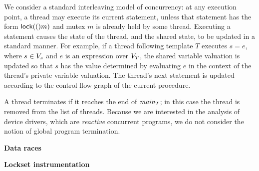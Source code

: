 We consider a standard interleaving model of concurrency: at any
execution point, a thread may execute its current statement, unless
that statement has the form $\mathsf{lock}(()m)$ and mutex $m$ is already held
by some thread.  Executing a statement causes the state of the thread,
and the shared state, to be updated in a standard manner.  For
example, if a thread following template $T$ executes $s = e$, where $s
\in V_s$ and $e$ is an expression over $V_{T}$, the
shared variable valuation is updated so that $s$ has the value
determined by evaluating $e$ in the context of the thread's private
variable valuation.  The thread's next statement is updated according
to the control flow graph of the current procedure.

A thread terminates if it reaches the end of $\mathit{main}_{T}$; in this
case the thread is removed from the list of threads.  Because we are
interested in the analysis of device drivers, which are
\emph{reactive} concurrent programs, we do not consider the notion of
global program termination.

\medskip\noindent\textbf{Data races } 

\medskip\noindent\textbf{Lockset instrumentation} 



